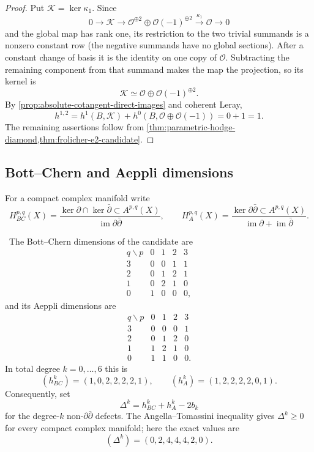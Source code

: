 \begin{proof}
Put $\mathcal K=\ker\kappa_1$.  Since
\[
0\longrightarrow\mathcal K\longrightarrow
\mathcal O^{\oplus2}\oplus\mathcal O(-1)^{\oplus2}
\xrightarrow{\kappa_1}\mathcal O\longrightarrow0
\]
and the global map has rank one, its restriction to the two trivial summands
is a nonzero constant row (the negative summands have no global sections).
After a constant change of basis it is the identity on one copy of
$\mathcal O$.  Subtracting the remaining component from that summand makes
the map the projection, so its kernel is
\[
 \mathcal K\simeq\mathcal O\oplus\mathcal O(-1)^{\oplus2}.
\]
By 
\cref{prop:absolute-cotangent-direct-images} and coherent Leray,
\[
 h^{1,2}=h^1(B,\mathcal K)
 +h^0(B,\mathcal O\oplus\mathcal O(-1))=0+1=1.
\]
The remaining assertions follow from
\cref{thm:parametric-hodge-diamond,thm:frolicher-e2-candidate}.
\end{proof}

\subsection{Bott--Chern and Aeppli dimensions}

For a compact complex manifold write
\[
 H^{p,q}_{BC}(X)=
 \frac{\ker\partial\cap\ker\bar\partial\subset A^{p,q}(X)}
      {\operatorname{im}\partial\bar\partial},
 \qquad
 H^{p,q}_{A}(X)=
 \frac{\ker\partial\bar\partial\subset A^{p,q}(X)}
      {\operatorname{im}\partial+\operatorname{im}\bar\partial}.
\]

\begin{theorem}
\label{thm:exact-bott-chern-aeppli}
\Verified\ The Bott--Chern dimensions of the candidate are
\[
\begin{array}{c|cccc}
q\backslash p&0&1&2&3\\ \hline
3&0&0&1&1\\
2&0&1&2&1\\
1&0&2&1&0\\
0&1&0&0&0,
\end{array}
\tag{11.21}
\]
and its Aeppli dimensions are
\[
\begin{array}{c|cccc}
q\backslash p&0&1&2&3\\ \hline
3&0&0&0&1\\
2&0&1&2&0\\
1&1&2&1&0\\
0&1&1&0&0.
\end{array}
\tag{11.22}
\]
In total degree $k=0,\ldots,6$ this is
\[
 (h^k_{BC})=(1,0,2,2,2,2,1),\qquad
 (h^k_A)=(1,2,2,2,2,0,1).
\tag{11.23}
\]
Consequently, set
\[
 \Delta^k=h^k_{BC}+h^k_A-2b_k
\]
for the degree-$k$ non-$\partial\bar\partial$ defects.  The
Angella--Tomassini inequality
\cite[Theorem~A]{AngellaTomassini2013} gives $\Delta^k\ge0$ for every compact
complex manifold; here the exact values are
\[
 (\Delta^k)=(0,2,4,4,4,2,0).
\tag{11.24}
\]
\end{theorem}


